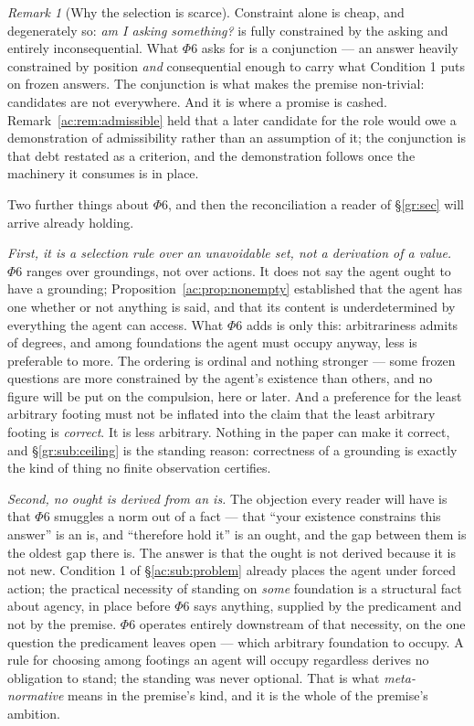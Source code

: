 \documentclass[11pt]{article}
\numberwithin{equation}{section}
\theoremstyle{plain}
\theoremstyle{definition}
\theoremstyle{remark}
\newtheorem{remark}[theorem]{Remark}
\begin{document}
\begin{remark}[Why the selection is scarce]\label{ac:rem:scarce}
Constraint alone is cheap, and degenerately so: \emph{am I asking something?} is fully constrained by the asking and entirely inconsequential. What $\Phi6$ asks for is a conjunction --- an answer heavily constrained by position \emph{and} consequential enough to carry what Condition 1 puts on frozen answers. The conjunction is what makes the premise non-trivial: candidates are not everywhere. And it is where a promise is cashed. Remark~\ref{ac:rem:admissible} held that a later candidate for the role would owe a demonstration of admissibility rather than an assumption of it; the conjunction is that debt restated as a criterion, and the demonstration follows once the machinery it consumes is in place.
\end{remark}

Two further things about $\Phi6$, and then the reconciliation a reader of \S\ref{gr:sec} will arrive already holding.

\emph{First, it is a selection rule over an unavoidable set, not a derivation of a value.} $\Phi6$ ranges over groundings, not over actions. It does not say the agent ought to have a grounding; Proposition~\ref{ac:prop:nonempty} established that the agent has one whether or not anything is said, and that its content is underdetermined by everything the agent can access. What $\Phi6$ adds is only this: arbitrariness admits of degrees, and among foundations the agent must occupy anyway, less is preferable to more. The ordering is ordinal and nothing stronger --- some frozen questions are more constrained by the agent's existence than others, and no figure will be put on the compulsion, here or later. And a preference for the least arbitrary footing must not be inflated into the claim that the least arbitrary footing is \emph{correct}. It is less arbitrary. Nothing in the paper can make it correct, and \S\ref{gr:sub:ceiling} is the standing reason: correctness of a grounding is exactly the kind of thing no finite observation certifies.

\emph{Second, no ought is derived from an is.} The objection every reader will have is that $\Phi6$ smuggles a norm out of a fact --- that ``your existence constrains this answer'' is an is, and ``therefore hold it'' is an ought, and the gap between them is the oldest gap there is. The answer is that the ought is not derived because it is not new. Condition 1 of \S\ref{ac:sub:problem} already places the agent under forced action; the practical necessity of standing on \emph{some} foundation is a structural fact about agency, in place before $\Phi6$ says anything, supplied by the predicament and not by the premise. $\Phi6$ operates entirely downstream of that necessity, on the one question the predicament leaves open --- which arbitrary foundation to occupy. A rule for choosing among footings an agent will occupy regardless derives no obligation to stand; the standing was never optional. That is what \emph{meta-normative} means in the premise's kind, and it is the whole of the premise's ambition.
\end{document}
